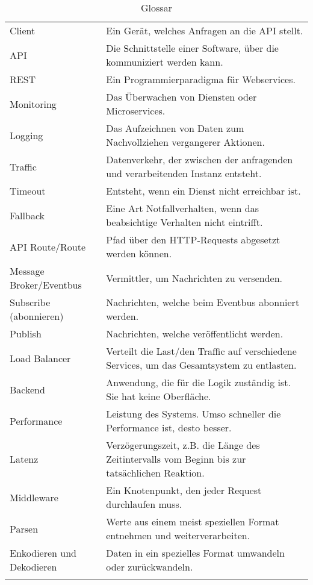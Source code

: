\begin{longtable}{lp{10cm}}
	Client & Ein Gerät, welches Anfragen an die API stellt. \\
	API & Die Schnittstelle einer Software, über die kommuniziert werden kann.\\
	REST & Ein Programmierparadigma für Webservices. \\
	Monitoring & Das Überwachen von Diensten oder Microservices.\\
	Logging & Das Aufzeichnen von Daten zum Nachvollziehen vergangerer Aktionen.\\
	Traffic & Datenverkehr, der zwischen der anfragenden und verarbeitenden Instanz entsteht.\\
	Timeout & Entsteht, wenn ein Dienst nicht erreichbar ist.\\
	Fallback & Eine Art Notfallverhalten, wenn das beabsichtige Verhalten nicht eintrifft.\\
	API Route/Route & Pfad über den HTTP-Requests abgesetzt werden können.\\
	Message Broker/Eventbus & Vermittler, um Nachrichten zu versenden.  \\
	Subscribe (abonnieren) & Nachrichten, welche beim Eventbus abonniert werden. \\
	Publish & Nachrichten, welche veröffentlicht werden. \\
	Load Balancer & Verteilt die Last/den Traffic auf verschiedene Services, um das Gesamtsystem zu entlasten.\\
	Backend & Anwendung, die für die Logik zuständig ist. Sie hat keine Oberfläche.\\
	Performance & Leistung des Systems. Umso schneller die Performance ist, desto besser.\\
	Latenz & Verzögerungszeit, z.B. die Länge des Zeitintervalls vom Beginn bis zur tatsächlichen Reaktion.\\
	Middleware & Ein Knotenpunkt, den jeder Request durchlaufen muss. \\
	Parsen & Werte aus einem meist speziellen Format entnehmen und weiterverarbeiten. \\ 
	Enkodieren und Dekodieren & Daten in ein spezielles Format umwandeln oder zurückwandeln.\\
	\caption[Glossar]{Glossar}
\end{longtable}